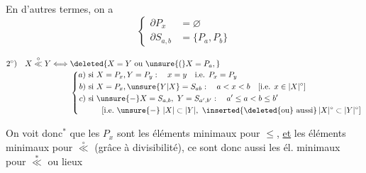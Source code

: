 En d'autres termes, on a
\[
\left\{\begin{aligned}
 \partial P_x&=\varnothing\\
 \partial S_{a,b}&=\{P_a,P_b\}
\end{aligned}\right.
\]

\[
\begin{aligned}
2^\circ)\quad X\overset{\circ}{\ll}Y\Longleftrightarrow{}&
  \deleted{X=Y\ \text{ou}\ \unsure{(}X=P_a,}\\[-2pt]
&\left\{\begin{aligned}
 a)&\ \text{si }X=P_x,Y=P_y:\quad x=y\quad\text{i.e. }P_x=P_y\\
 b)&\ \text{si }X=P_x,\unsure{Y|X}=S_{ab}:\quad a<x<b\quad
       [\text{i.e. }x\in|X|^\circ]\\
 c)&\ \text{si }\unsure{-}X=S_{a,b},\ Y=S_{a',b'}:\quad a'\leq a<b\leq b'\\
   &\qquad[\text{i.e.}\ \unsure{-}\ |X|\subset|Y|,\ \inserted{\text{\deleted{ou} aussi}}\,
                 |X|^\circ\subset|Y|^\circ]
 \end{aligned}\right.
\end{aligned}
\]

On voit donc\({}^{*}\) que les $P_x$ sont les éléments minimaux pour $\leq$, \uline{et} les éléments minimaux pour $\overset{\circ}{\ll}$ (grâce à divisibilité), ce sont donc aussi les él. minimaux pour $\overset{*}{\ll}$ ou lieux

